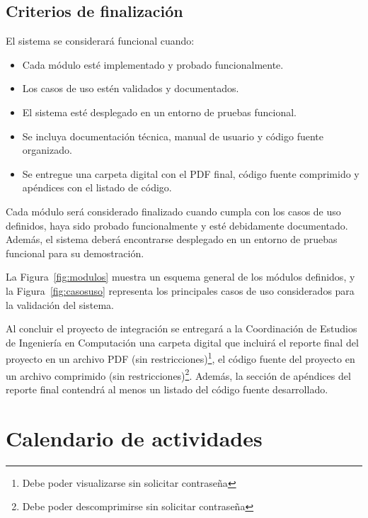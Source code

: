 \subsection*{Criterios de finalización}

El sistema se considerará funcional cuando:

\begin{itemize}
	\item Cada módulo esté implementado y probado funcionalmente.
	\item Los casos de uso estén validados y documentados.
	\item El sistema esté desplegado en un entorno de pruebas funcional.
	\item Se incluya documentación técnica, manual de usuario y código fuente organizado.
	\item Se entregue una carpeta digital con el PDF final, código fuente comprimido y apéndices con el listado de código.
\end{itemize}


	
	Cada módulo será considerado finalizado cuando cumpla con los casos de uso definidos, haya sido probado funcionalmente y esté debidamente documentado. Además, el sistema deberá encontrarse desplegado en un entorno de pruebas funcional para su demostración.
	
	La Figura~\ref{fig:modulos} muestra un esquema general de los módulos definidos, y la Figura~\ref{fig:casosuso} representa los principales casos de uso considerados para la validación del sistema.
	
	\vspace{0.5cm}
	
	Al concluir el proyecto de integración se entregará a la Coordinación de Estudios de Ingeniería en Computación una carpeta digital que incluirá el reporte final del proyecto en un archivo PDF (sin restricciones)\footnote{Debe poder visualizarse sin solicitar contraseña}, el código fuente del proyecto en un archivo comprimido (sin restricciones)\footnote{Debe poder descomprimirse sin solicitar contraseña}. Además, la sección de apéndices del reporte final contendrá al menos un listado del código fuente desarrollado.


	\section{Calendario de actividades}

